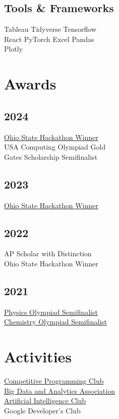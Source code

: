 \documentclass[]{Farhan_Resume_Class}
\begin{document}
\begin{minipage}[t]{0.25\textwidth}
    \subsection{Tools \& Frameworks}
    Tableau \textbullet{} Tidyverse \textbullet{} Tensorflow \\ React \textbullet{}
    PyTorch \textbullet{} Excel \textbullet{} Pandas\\ Plotly

    \sectionsep


    \section{Awards}
    \subsection{2024}
    \href{https://hack.osu.edu/hs/fall-2023/}{Ohio State Hackathon Winner} \\
    USA Computing Olympiad Gold \\
    Gates Scholarship Semifinalist
    \subsection{2023}
    \href{https://hack.osu.edu/hs/fall-2023/}{Ohio State Hackathon Winner} \\

    \subsection{2022}
    {AP Scholar with Distinction} \\
    {Ohio State Hackathon Winner} \\
    \subsection{2021}
    \href{https://www.aapt.org/physicsteam/2024/index.cfm}{Physics Olympiad Semifinalist} \\
    \href{https://www.acs.org/education/students/highschool/olympiad.html}{Chemistry Olympiad Semifinalist} \\

    \section{Activities}
    \href{https://cpcosu.github.io/}{Competitive Programming Club} \\
    \href{https://bdaaosu.org/}{Big Data and Analytics Association} \\
    \href{https://www.osuaiclub.com/}{Artificial Intelligence Club} \\
    Google Developer's Club


\end{minipage}
\end{document}
